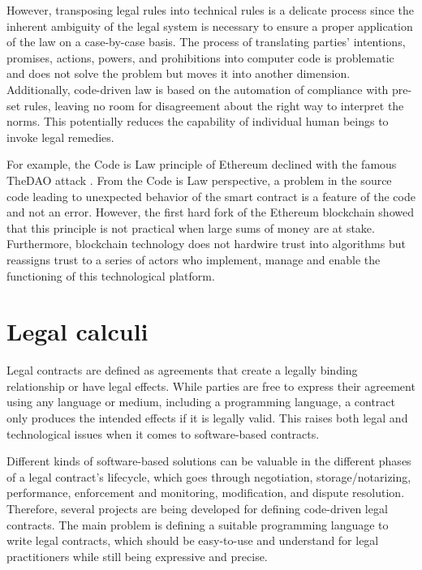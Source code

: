 However, transposing legal rules into technical rules is a delicate process since the inherent ambiguity of 
the legal system is necessary to ensure a proper application of the law on a case-by-case basis. The 
process of translating parties' intentions, promises, actions, powers, and prohibitions into computer code 
is problematic and does not solve the problem but moves it into another dimension. Additionally, 
code-driven law is based on the automation of compliance with pre-set rules, leaving no room for 
disagreement about the right way to interpret the norms. This potentially reduces the capability of 
individual human beings to invoke legal remedies.

For example, the Code is Law principle of Ethereum declined with the famous TheDAO attack 
\autocite{article:dao-attack}. From the Code is Law perspective, a problem in the source code leading to 
unexpected behavior of the smart contract is a feature of the code and not an error. However, the first 
hard fork of the Ethereum blockchain showed that this principle is not practical when large sums of money 
are at stake. Furthermore, blockchain technology does not hardwire trust into algorithms but reassigns 
trust to a series of actors who implement, manage and enable the functioning of this technological platform.

\section{Legal calculi}

Legal contracts are defined as agreements that create a legally binding relationship or have legal effects. 
While parties are free to express their agreement using any language or medium, including a programming 
language, a contract only produces the intended effects if it is legally valid. This raises both legal and 
technological issues when it comes to software-based contracts.

Different kinds of software-based solutions can be valuable in the different phases of a legal contract's 
lifecycle, which goes through negotiation, storage/notarizing, performance, enforcement and monitoring, 
modification, and dispute resolution. Therefore, several projects are being developed for defining 
code-driven legal contracts. The main problem is defining a suitable programming language to write legal 
contracts, which should be easy-to-use and understand for legal practitioners while still being expressive 
and precise.

